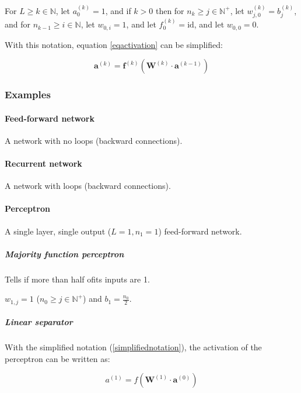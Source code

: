 \documentclass[titlepage]{article}
\begin{document}
        For $L \geq k \in \mathbb{N}$, let $a_0^{(k)} = 1$, and if $k > 0$ then
        for $n_k \geq j \in \mathbb{N}^+$, let $w_{j, 0}^{(k)} = b_{j}^{(k)}$,
        and for $n_{k-1} \geq i \in \mathbb{N}$, let $w_{0,i} = 1$,
        and let $f_0^{(k)} = \text{id}$, and let $w_{0,0}=0$.

        With this notation, equation \ref{eqactivation} can be simplified:

        \begin{equation}\label{eqactivationsimple}
          \mathbf{a}^{(k)} =
            \mathbf{f}^{(k)} \left(
              \mathbf{W}^{(k)} \cdot \mathbf{a}^{(k-1)}
            \right)
        \end{equation}

      \subsubsection{Examples}

        \paragraph{Feed-forward network}

          A network with no loops (backward connections).

        \paragraph{Recurrent network}

          A network with loops (backward connections).

        \paragraph{Perceptron}

          A single layer, single output ($L = 1, n_1 = 1$) feed-forward network.

          \subparagraph{Majority function perceptron}

            Tells if more than half ofits inputs are 1.

            $w_{1,j} = 1$ ($n_0 \geq j \in \mathbb{N}^+$) and
            $b_1 = \frac{n_0}{2}$.

          \subparagraph{Linear separator}
            With the simplified notation (\ref{simplifiednotation}), the
            activation of the perceptron can be written as:

            \begin{equation}
              a^{(1)} = f \left( \mathbf{W}^{(1)} \cdot \mathbf{a}^{(0)} \right)
            \end{equation}
\end{document}
